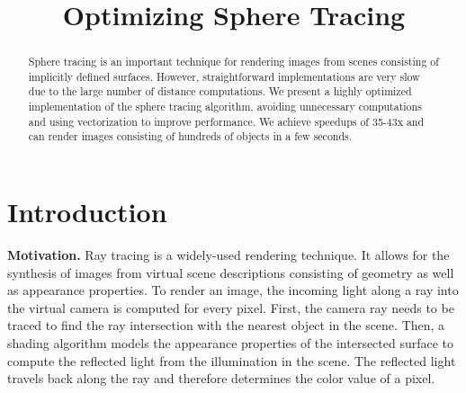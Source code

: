 \documentclass[letterpaper]{article}
\title{Optimizing Sphere Tracing}
\newcommand{\mypar}[1]{{\bf #1.}}
\begin{document}
%
\maketitle
%



\begin{abstract}
Sphere tracing is an important technique for rendering images from scenes consisting of implicitly defined surfaces. However, straightforward implementations are very slow due to the large number of distance computations. We present a highly optimized implementation of the sphere tracing algorithm, avoiding unnecessary computations and using vectorization to improve performance. We achieve speedups of 35-43x and can render images consisting of hundreds of objects in a few seconds.
\end{abstract}

\section{Introduction}\label{sec:intro}

\mypar{Motivation}
Ray tracing is a widely-used rendering technique. It allows for the synthesis of images from virtual scene descriptions consisting of geometry as well as appearance properties. To render an image, the incoming light along a ray into the virtual camera is computed for every pixel. First, the camera ray needs to be traced to find the ray intersection with the nearest object in the scene. Then, a shading algorithm models the appearance properties of the intersected surface to compute the reflected light from the illumination in the scene. The reflected light travels back along the ray and therefore determines the color value of a pixel.
\end{document}

